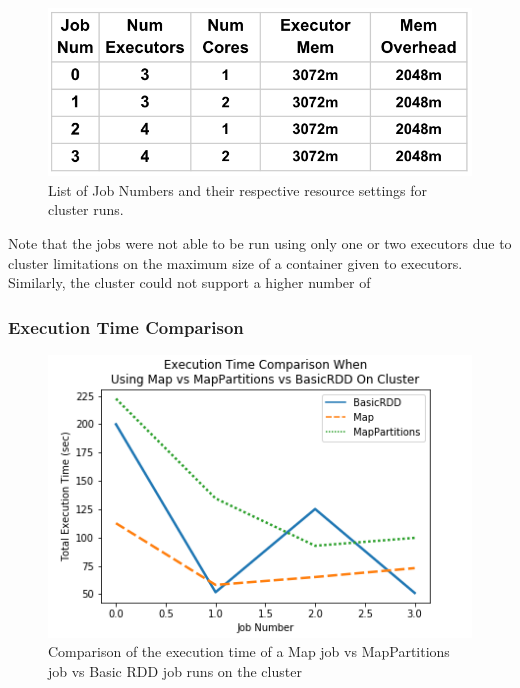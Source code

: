 \documentclass[conference]{IEEEtran}
\begin{document}
\begin{figure}
    \includegraphics[width=\linewidth]{cluster_run_settings.PNG}
    \caption{List of Job Numbers and their respective resource settings for cluster runs.}
    \label{fig:clusterjobs}
\end{figure}

Note that the jobs were not able to be run using only one or two executors due to cluster limitations on the maximum size of a container given to executors.
Similarly, the cluster could not support a higher number of

\subsubsection{Execution Time Comparison}

\begin{figure}
    \includegraphics[width=\linewidth]{../python_scripts/images/mapVsMapPartitionsAllExecutionTimeCluster.png}
    \caption{Comparison of the execution time of a Map job vs MapPartitions job vs Basic RDD job runs on the cluster}
    \label{fig:mapVMapPartitionsAllExecTimeCluster}
\end{figure}
\end{document}

